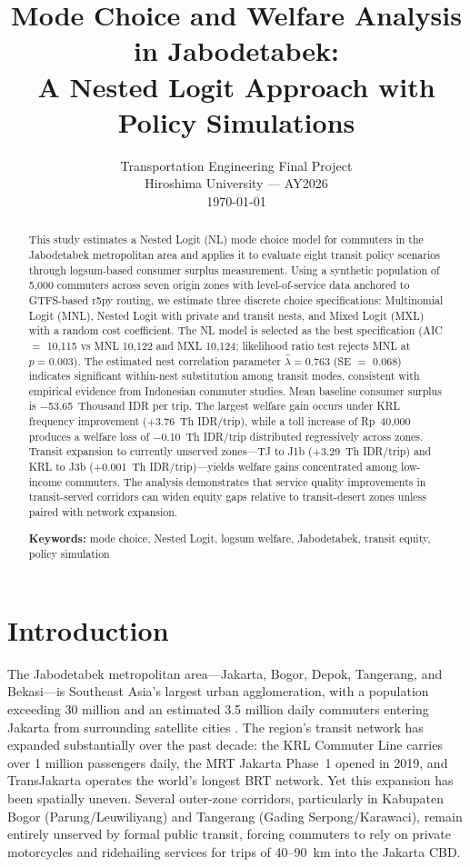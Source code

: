 \documentclass[12pt,a4paper]{article}
\title{Mode Choice and Welfare Analysis in Jabodetabek:\\A Nested Logit Approach with Policy Simulations}
\author{}
\date{Transportation Engineering Final Project\\Hiroshima University --- AY2026\\\vspace{0.5cm}\today}
\begin{document}
\maketitle

\begin{abstract}
\noindent
This study estimates a Nested Logit (NL) mode choice model for commuters in the Jabodetabek metropolitan area and applies it to evaluate eight transit policy scenarios through logsum-based consumer surplus measurement. Using a synthetic population of 5,000 commuters across seven origin zones with level-of-service data anchored to GTFS-based r5py routing, we estimate three discrete choice specifications: Multinomial Logit (MNL), Nested Logit with private and transit nests, and Mixed Logit (MXL) with a random cost coefficient. The NL model is selected as the best specification (AIC $=$ 10,115 vs MNL 10,122 and MXL 10,124; likelihood ratio test rejects MNL at $p = 0.003$). The estimated nest correlation parameter $\hat{\lambda} = 0.763$ (SE $=$ 0.068) indicates significant within-nest substitution among transit modes, consistent with empirical evidence from Indonesian commuter studies. Mean baseline consumer surplus is $-$53.65~Thousand IDR per trip. The largest welfare gain occurs under KRL frequency improvement ($+$3.76~Th IDR/trip), while a toll increase of Rp~40,000 produces a welfare loss of $-$0.10~Th IDR/trip distributed regressively across zones. Transit expansion to currently unserved zones---TJ to J1b ($+$3.29~Th IDR/trip) and KRL to J3b ($+$0.001~Th IDR/trip)---yields welfare gains concentrated among low-income commuters. The analysis demonstrates that service quality improvements in transit-served corridors can widen equity gaps relative to transit-desert zones unless paired with network expansion.

\vspace{0.3cm}
\noindent\textbf{Keywords:} mode choice, Nested Logit, logsum welfare, Jabodetabek, transit equity, policy simulation
\end{abstract}

\section{Introduction}

The Jabodetabek metropolitan area---Jakarta, Bogor, Depok, Tangerang, and Bekasi---is Southeast Asia's largest urban agglomeration, with a population exceeding 30 million and an estimated 3.5 million daily commuters entering Jakarta from surrounding satellite cities \citep{bps2023}. The region's transit network has expanded substantially over the past decade: the KRL Commuter Line carries over 1 million passengers daily, the MRT Jakarta Phase~1 opened in 2019, and TransJakarta operates the world's longest BRT network. Yet this expansion has been spatially uneven. Several outer-zone corridors, particularly in Kabupaten Bogor (Parung/Leuwiliyang) and Tangerang (Gading Serpong/Karawaci), remain entirely unserved by formal public transit, forcing commuters to rely on private motorcycles and ridehailing services for trips of 40--90~km into the Jakarta CBD.
\end{document}
